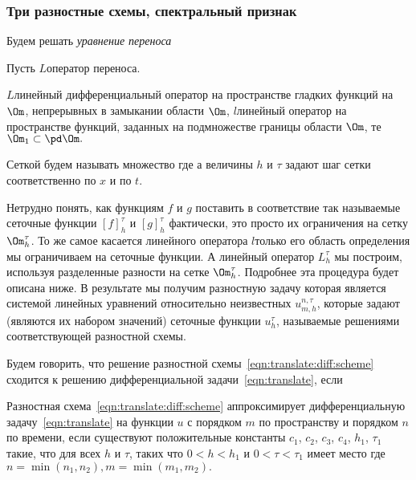 \documentclass[a4paper]{article}
\begin{document}
\subsubsection{Три разностные схемы, спектральный признак}

Будем решать \emph{уравнение переноса}

Пусть $L$\т оператор переноса.

$L$\т линейный дифференциальный оператор на
пространстве гладких функций на $\Om$, непрерывных в замыкании
области $\Om$, $l$\т линейный оператор на пространстве функций,
заданных на подмножестве границы области $\Om$, те $\Om_1\subset\pd\Om.$

\begin{df}
Сеткой будем называть множество  где  а величины $h$ и $\tau$ задают шаг сетки
соответственно по $x$ и по $t$.
\end{df}
Нетрудно понять, как функциям $f$ и $g$ поставить в соответствие так
называемые сеточные функции $[f]_h^{\tau}$ и $[g]_h^{\tau}$\т
фактически, это просто их ограничения на сетку $\Om_h^{\tau}$. То же
самое касается линейного оператора $l$\т только его область
определения мы ограничиваем на сеточные функции. А линейный оператор
$L_h^{\tau}$ мы построим, используя разделенные разности на сетке
$\Om_h^{\tau}$. Подробнее эта процедура будет описана ниже. В
результате мы получим разностную задачу  которая является системой линейных уравнений относительно
неизвестных $u_{m,h}^{n,\tau}$, которые задают (являются их набором
значений) сеточные функции $u_h^{\tau}$, называемые решениями
соответствующей разностной схемы.
\begin{df}
Будем говорить, что решение разностной схемы~\eqref{eqn:translate:diff:scheme} сходится к решению
дифференциальной задачи~\eqref{eqn:translate}, если
\end{df}
\begin{df}
Разностная схема~\eqref{eqn:translate:diff:scheme} аппроксимирует дифференциальную задачу~\eqref{eqn:translate} на
функции $u$ с порядком $m$ по пространству и порядком $n$ по
времени, если существуют положительные константы $c_1$, $c_2$, $c_3$, $c_4$, $h_1$, $\tau_1$
такие, что для всех $h$ и $\tau$, таких что $0<h<h_1$ и $0<\tau<\tau_1$ имеет место
где $n=\min(n_1, n_2), m=\min(m_1, m_2).$
\end{df}
\end{document}
